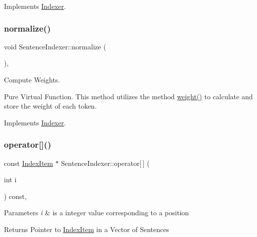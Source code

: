 Implements \hyperlink{class_indexer_aadcdca40938d27c465e564ac8852f02d}{Indexer}.

\mbox{\label{class_sentence_indexer_ae038d36081439a5107821ac48a318d66}} 
\subsubsection{\texorpdfstring{normalize()}{normalize()}}
{\footnotesize\ttfamily void Sentence\+Indexer\+::normalize (\begin{DoxyParamCaption}{ }\end{DoxyParamCaption})\hspace{0.3cm}{\ttfamily [override]}, {\ttfamily [virtual]}}



Compute Weights. 

Pure Virtual Function. This method utilizes the method \hyperlink{class_sentence_indexer_ad436ab76195615090de457b50aabfe7b}{weight()} to calculate and store the weight of each token. 

Implements \hyperlink{class_indexer_a84f50c7bac96cd5a8daa18899a39bb5d}{Indexer}.

\mbox{\label{class_sentence_indexer_a4f8655135cb46ba4fee6a53418f15d03}} 
\subsubsection{\texorpdfstring{operator[]()}{operator[]()}}
{\footnotesize\ttfamily const \hyperlink{class_index_item}{Index\+Item} $\ast$ Sentence\+Indexer\+::operator\mbox{[}$\,$\mbox{]} (\begin{DoxyParamCaption}\item[{int}]{i }\end{DoxyParamCaption}) const\hspace{0.3cm}{\ttfamily [override]}, {\ttfamily [virtual]}}


\begin{DoxyParams}{Parameters}
{\em i} & is a integer value corresponding to a position \\
\hline
\end{DoxyParams}
\begin{DoxyReturn}{Returns}
Pointer to \hyperlink{class_index_item}{Index\+Item} in a Vector of Sentences 
\end{DoxyReturn}



